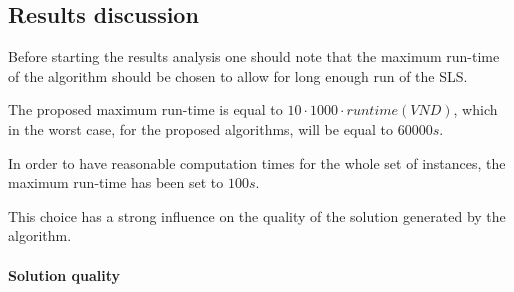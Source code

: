 
\subsection{Results discussion}
Before starting the results analysis one should note that the maximum run-time of the algorithm should be chosen to allow for long enough run of the SLS.
  
The proposed maximum run-time is equal to $10 \cdot 1000 \cdot runtime(VND)$, which in the worst case, for the proposed algorithms, will be equal to $60000s$.
  
In order to have reasonable computation times for the whole set of instances, the maximum run-time has been set to $100s$.
  
This choice has a strong influence on the quality of the solution generated by the algorithm.

\paragraph{Solution quality}

